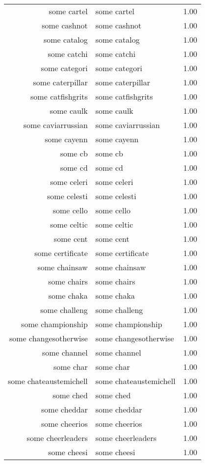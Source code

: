 \begin{table}[ht]
\begin{tabular}{rlr}
  some cartel & some cartel & 1.00 \\ 
  some cashnot & some cashnot & 1.00 \\ 
  some catalog & some catalog & 1.00 \\ 
  some catchi & some catchi & 1.00 \\ 
  some categori & some categori & 1.00 \\ 
  some caterpillar & some caterpillar & 1.00 \\ 
  some catfishgrits & some catfishgrits & 1.00 \\ 
  some caulk & some caulk & 1.00 \\ 
  some caviarrussian & some caviarrussian & 1.00 \\ 
  some cayenn & some cayenn & 1.00 \\ 
  some cb & some cb & 1.00 \\ 
  some cd & some cd & 1.00 \\ 
  some celeri & some celeri & 1.00 \\ 
  some celesti & some celesti & 1.00 \\ 
  some cello & some cello & 1.00 \\ 
  some celtic & some celtic & 1.00 \\ 
  some cent & some cent & 1.00 \\ 
  some certificate & some certificate & 1.00 \\ 
  some chainsaw & some chainsaw & 1.00 \\ 
  some chairs & some chairs & 1.00 \\ 
  some chaka & some chaka & 1.00 \\ 
  some challeng & some challeng & 1.00 \\ 
  some championship & some championship & 1.00 \\ 
  some changesotherwise & some changesotherwise & 1.00 \\ 
  some channel & some channel & 1.00 \\ 
  some char & some char & 1.00 \\ 
  some chateaustemichell & some chateaustemichell & 1.00 \\ 
  some ched & some ched & 1.00 \\ 
  some cheddar & some cheddar & 1.00 \\ 
  some cheerios & some cheerios & 1.00 \\ 
  some cheerleaders & some cheerleaders & 1.00 \\ 
  some cheesi & some cheesi & 1.00 \\ 

\end{tabular}
\end{table}
